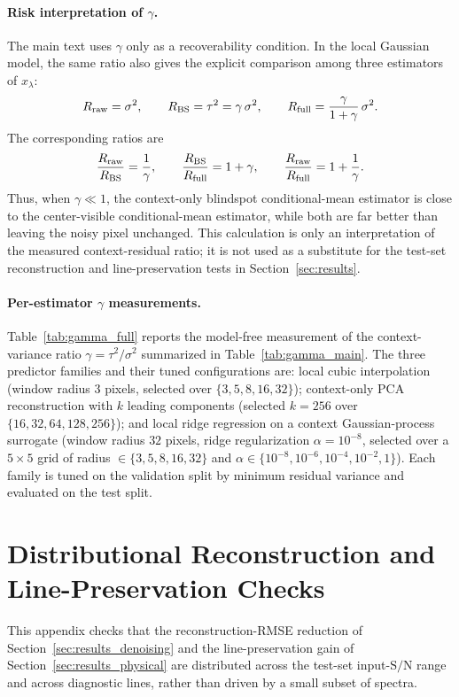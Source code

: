 \documentclass[twocolumn]{aastex7}
\newcommand{\SNR}{\mathrm{S}/\mathrm{N}}
\begin{document}
\paragraph{Risk interpretation of $\gamma$.}
\label{app:gamma_risk_interpretation}
The main text uses $\gamma$ only as a recoverability condition. In the local Gaussian model, the same ratio also gives the explicit comparison among three estimators of $x_{\lambda}$:
\[
    R_{\rm raw} = \sigma^{2},
    \qquad
    R_{\rm BS} = \tau^{2} = \gamma\,\sigma^{2},
    \qquad
    R_{\rm full} = \frac{\gamma}{1+\gamma}\,\sigma^{2}.
\]
The corresponding ratios are
\[
    \frac{R_{\rm raw}}{R_{\rm BS}} = \frac{1}{\gamma},
    \qquad
    \frac{R_{\rm BS}}{R_{\rm full}} = 1+\gamma,
    \qquad
    \frac{R_{\rm raw}}{R_{\rm full}} = 1 + \frac{1}{\gamma}.
\]
Thus, when $\gamma\ll1$, the context-only blindspot conditional-mean estimator is close to the center-visible conditional-mean estimator, while both are far better than leaving the noisy pixel unchanged. This calculation is only an interpretation of the measured context-residual ratio; it is not used as a substitute for the test-set reconstruction and line-preservation tests in Section~\ref{sec:results}.

\paragraph{Per-estimator $\gamma$ measurements.}
Table~\ref{tab:gamma_full} reports the model-free measurement of the context-variance ratio $\gamma=\tau^{2}/\sigma^{2}$ summarized in Table~\ref{tab:gamma_main}. The three predictor families and their tuned configurations are: local cubic interpolation (window radius $3$ pixels, selected over $\{3,5,8,16,32\}$); context-only PCA reconstruction with $k$ leading components (selected $k=256$ over $\{16,32,64,128,256\}$); and local ridge regression on a context Gaussian-process surrogate (window radius $32$ pixels, ridge regularization $\alpha=10^{-8}$, selected over a $5\times5$ grid of radius $\in\{3,5,8,16,32\}$ and $\alpha\in\{10^{-8},10^{-6},10^{-4},10^{-2},1\}$). Each family is tuned on the validation split by minimum residual variance and evaluated on the test split.

\section{Distributional Reconstruction and Line-Preservation Checks}
\label{app:line_addenda}

This appendix checks that the reconstruction-RMSE reduction of Section~\ref{sec:results_denoising} and the line-preservation gain of Section~\ref{sec:results_physical} are distributed across the test-set input-$\SNR$ range and across diagnostic lines, rather than driven by a small subset of spectra.
\end{document}
